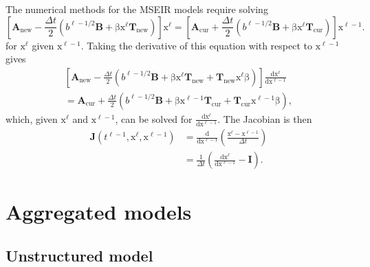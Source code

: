 \documentclass[USenglish]{article}
\renewcommand{\vec}[1]{\boldsymbol{\mathrm{#1}}}
\newcommand{\mat}[1]{\mathbf{#1}}
\newcommand{\md}{\mathrm{d}}
\begin{document}
The numerical methods for the MSEIR models require solving
\begin{equation}
  \label{step}
  \left[
    \mat{A}_{\mathrm{new}}
    - \frac{\Delta t}{2} \left(
      b^{\ell - 1 / 2} \mat{B}
      + \vec{\beta} \vec{x}^{\ell} \mat{T}_{\mathrm{new}}
    \right)
  \right]
  \vec{x}^{\ell}
  =
  \left[
    \mat{A}_{\mathrm{cur}}
    + \frac{\Delta t}{2} \left(
      b^{\ell - 1 / 2} \mat{B}
      + \vec{\beta} \vec{x}^{\ell} \mat{T}_{\mathrm{cur}}
    \right)
  \right]
  \vec{x}^{\ell - 1}.
\end{equation}
for $\vec{x}^{\ell}$ given $\vec{x}^{\ell - 1}$.
Taking the derivative of this equation with respect to
$\vec{x}^{\ell - 1}$ gives
\begin{multline}
  \left[
    \mat{A}_{\mathrm{new}}
    - \frac{\Delta t}{2}
    \left(
      b^{\ell - 1 / 2} \mat{B}
      + \vec{\beta} \vec{x}^{\ell} \mat{T}_{\mathrm{new}}
      + \mat{T}_{\mathrm{new}} \vec{x}^{\ell} \vec{\beta}
    \right)
  \right]
  \frac{\md \vec{x}^{\ell}}{\md \vec{x}^{\ell - 1}}
  \\
  = \mat{A}_{\mathrm{cur}}
  + \frac{\Delta t}{2}
  \left(
    b^{\ell - 1 / 2} \mat{B}
    + \vec{\beta} \vec{x}^{\ell - 1} \mat{T}_{\mathrm{cur}}
    + \mat{T}_{\mathrm{cur}} \vec{x}^{\ell - 1} \vec{\beta}
  \right),
\end{multline}
which, given $\vec{x}^{\ell}$ and $\vec{x}^{\ell - 1}$,
can be solved for $\frac{\md \vec{x}^{\ell}}{\md \vec{x}^{\ell - 1}}$.
The Jacobian is then
\begin{equation}
  \begin{split}
    \mat{J}\left(t^{\ell - 1}, \vec{x}^{\ell}, \vec{x}^{\ell - 1}\right)
    &= \frac{\md}{\md \vec{x}^{\ell - 1}}
      \left(
      \frac{\vec{x}^{\ell} - \vec{x}^{\ell - 1}}{\Delta t}
      \right)
    \\
    &= \frac{1}{\Delta t} \left(
      \frac{\md \vec{x}^{\ell}}{\md \vec{x}^{\ell - 1}}
      - \mat{I}
      \right).
  \end{split}
\end{equation}


\section{Aggregated models}


\subsection{Unstructured model}
\end{document}
